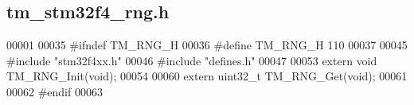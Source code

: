 \hypertarget{tm__stm32f4__rng_8h_source}{}\subsection{tm\+\_\+stm32f4\+\_\+rng.\+h}

\begin{DoxyCode}
00001 
00035 \textcolor{preprocessor}{#ifndef TM\_RNG\_H}
00036 \textcolor{preprocessor}{#define TM\_RNG\_H 110}
00037 
00045 \textcolor{preprocessor}{#include "stm32f4xx.h"}
00046 \textcolor{preprocessor}{#include "defines.h"}
00047 
00053 \textcolor{keyword}{extern} \textcolor{keywordtype}{void} TM\_RNG\_Init(\textcolor{keywordtype}{void});
00054 
00060 \textcolor{keyword}{extern} uint32\_t TM\_RNG\_Get(\textcolor{keywordtype}{void});
00061 
00062 \textcolor{preprocessor}{#endif}
00063 
\end{DoxyCode}
